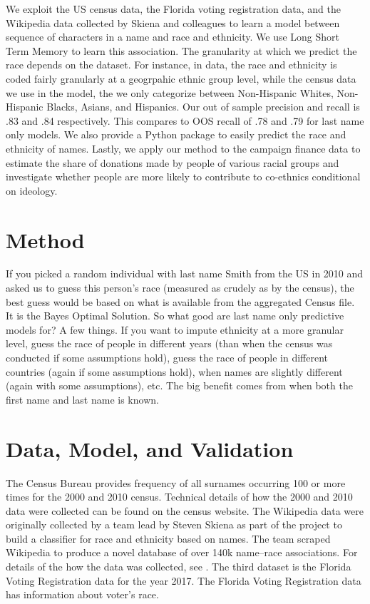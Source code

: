 \documentclass[12pt, letterpaper]{article}
\begin{document}
We exploit the US census data, the Florida voting registration data, and the Wikipedia data collected by Skiena and colleagues \citep{ambekar2009name} to learn a model between sequence of characters in a name and race and ethnicity. We use Long Short Term Memory to learn this association. The granularity at which we predict the race depends on the dataset. For instance, in \citet{ambekar2009name} data, the race and ethnicity is coded fairly granularly at a geogrpahic ethnic group level, while the census data we use in the model, the we only categorize between Non-Hispanic Whites, Non-Hispanic Blacks, Asians, and Hispanics. Our out of sample precision and recall is .83 and .84 respectively. This compares to OOS recall of .78 and .79 for last name only models. We also provide a Python package to easily predict the race and ethnicity of names. Lastly, we apply our method to the campaign finance data to estimate the share of donations made by people of various racial groups and investigate whether people are more likely to contribute to co-ethnics conditional on ideology.

\section*{Method}
If you picked a random individual with last name Smith from the US in 2010 and asked us to guess this person's race (measured as crudely as by the census), the best guess would be based on what is available from the aggregated Census file. It is the Bayes Optimal Solution. So what good are last name only predictive models for? A few things. If you want to impute ethnicity at a more granular level, guess the race of people in different years (than when the census was conducted if some assumptions hold), guess the race of people in different countries (again if some assumptions hold), when names are slightly different (again with some assumptions), etc. The big benefit comes from when both the first name and last name is known.

\section*{Data, Model, and Validation}
The Census Bureau provides frequency of all surnames occurring 100 or more times for the 2000 and 2010 census. Technical details of how the 2000 and 2010 data were collected can be found on the census website. 
The Wikipedia data were originally collected by a team lead by Steven Skiena as part of the project to build a classifier for race and ethnicity based on names. The team scraped Wikipedia to produce a novel database of over 140k name--race associations. For details of the how the data was collected, see \citet{ambekar2009name}. The third dataset is the Florida Voting Registration data for the year 2017. The Florida Voting Registration data has information about voter's race. 
\end{document}
